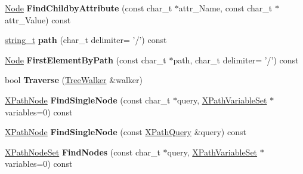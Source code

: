 \begin{DoxyCompactItemize}
\item 
\hypertarget{classphys_1_1xml_1_1Node_a3644bfc954295d9817f1385d2481a675}{
\hyperlink{classphys_1_1xml_1_1Node}{Node} {\bfseries FindChildbyAttribute} (const char\_\-t $\ast$attr\_\-Name, const char\_\-t $\ast$attr\_\-Value) const }
\label{d7/d0a/classphys_1_1xml_1_1Node_a3644bfc954295d9817f1385d2481a675}

\item 
\hypertarget{classphys_1_1xml_1_1Node_a74b9f51a6642808510e71f643cc861ad}{
\hyperlink{namespacephys_1_1xml_a6db751f2b35502e04c123bb70daa0d20}{string\_\-t} {\bfseries path} (char\_\-t delimiter= '/') const }
\label{d7/d0a/classphys_1_1xml_1_1Node_a74b9f51a6642808510e71f643cc861ad}

\item 
\hypertarget{classphys_1_1xml_1_1Node_a462333d5e538343ecf2150f71bc1a3be}{
\hyperlink{classphys_1_1xml_1_1Node}{Node} {\bfseries FirstElementByPath} (const char\_\-t $\ast$path, char\_\-t delimiter= '/') const }
\label{d7/d0a/classphys_1_1xml_1_1Node_a462333d5e538343ecf2150f71bc1a3be}

\item 
\hypertarget{classphys_1_1xml_1_1Node_abeb7db64dccb5ab42c27a3263ba5b549}{
bool {\bfseries Traverse} (\hyperlink{classphys_1_1xml_1_1TreeWalker}{TreeWalker} \&walker)}
\label{d7/d0a/classphys_1_1xml_1_1Node_abeb7db64dccb5ab42c27a3263ba5b549}

\item 
\hypertarget{classphys_1_1xml_1_1Node_a9026ddc7ccab8fcd844aa52ec09affc3}{
\hyperlink{classphys_1_1xml_1_1XPathNode}{XPathNode} {\bfseries FindSingleNode} (const char\_\-t $\ast$query, \hyperlink{classphys_1_1xml_1_1XPathVariableSet}{XPathVariableSet} $\ast$variables=0) const }
\label{d7/d0a/classphys_1_1xml_1_1Node_a9026ddc7ccab8fcd844aa52ec09affc3}

\item 
\hypertarget{classphys_1_1xml_1_1Node_ae1a69821d5eb5997c25e3a6ec1ef8b74}{
\hyperlink{classphys_1_1xml_1_1XPathNode}{XPathNode} {\bfseries FindSingleNode} (const \hyperlink{classphys_1_1xml_1_1XPathQuery}{XPathQuery} \&query) const }
\label{d7/d0a/classphys_1_1xml_1_1Node_ae1a69821d5eb5997c25e3a6ec1ef8b74}

\item 
\hypertarget{classphys_1_1xml_1_1Node_a7390ba1c09b83544365abc7bf8ec5b8f}{
\hyperlink{classphys_1_1xml_1_1XPathNodeSet}{XPathNodeSet} {\bfseries FindNodes} (const char\_\-t $\ast$query, \hyperlink{classphys_1_1xml_1_1XPathVariableSet}{XPathVariableSet} $\ast$variables=0) const }
\label{d7/d0a/classphys_1_1xml_1_1Node_a7390ba1c09b83544365abc7bf8ec5b8f}


\end{DoxyCompactItemize}

